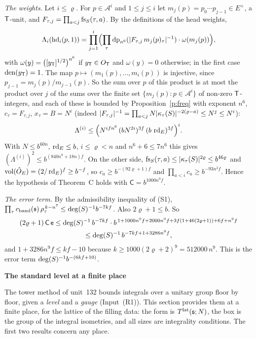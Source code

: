 \documentclass[11pt,a4paper]{article}
\makeatletter
\newcommand{\sect}[2]{\refstepcounter{section}\label{#2}\par\addvspace{19pt plus 4pt minus 2pt}\Needspace{7\baselineskip}%
  \noindent\llap{{\fontsize{13.2}{16}\selectfont\bfseries\color{inkfaint}\thesection}\hspace{9pt}}%
  {\fontsize{13.2}{16}\selectfont\bfseries\color{ink}#1}\par\nopagebreak\vspace{-1pt}}
\theoremstyle{plainx}
\theoremstyle{uprightx}
\renewenvironment{proof}[1][Proof]{\par\pushQED{\qed}\normalfont\topsep0pt\partopsep0pt
  \trivlist\item[\hskip\labelsep\itshape #1.]\ignorespaces}{\popQED\endtrivlist\@endpefalse}
\newcommand{\Inp}[1]{\textup{(#1)}}
\makeatother
\begin{document}
\begin{proof}[Proof of Theorem D]
\emph{The weights.} Let $i\le\varrho$. For $p\in\mathcal{A}^{i}$ and $1\le j\le i$ let $m_j(p)=p_0\cdots p_{j-1}\in E^{\times}$,
a $\mathsf{T}$-unit, and $F_{\tau,j}=\prod_{a<j}\mathrm{fs}_{S}(\tau,a)$. By the definitions of the head weights,
\[\Lambda_i(\mathrm{hd}_i(p,1))=\prod_{j=1}^{i}\Bigl(\prod_\tau\operatorname{dp}_{n^{6}}(|F_{\tau,j}\,m_j(p)_\tau|^{-1})\cdot\omega(m_j(p))\Bigr),\]
with $\omega(y)=\bigl([y_{\mathsf{T}}]^{1/2}\bigr)^{n^{6}}$ if $y_{\mathsf{T}}\in O_{\mathsf{T}}$ and $\omega(y)=0$ otherwise; in the first
case $\operatorname{den}(y_{\mathsf{T}})=1$. The map $p\mapsto(m_1(p),\dots,m_i(p))$ is injective, since $p_{j-1}=m_j(p)/m_{j-1}(p)$. So
the sum over $p$ of this product is at most the product over $j$ of the sums over the finite set
$\{m_j(p):p\in\mathcal{A}^{i}\}$ of non-zero $\mathsf{T}$-integers, and each of these is bounded by
Proposition~\ref{p:freq} with exponent $n^{6}$, $c_\tau=F_{\tau,j}$, $x_\tau=B=N^{i}$ (indeed
$|F_{\tau,j}|^{-1}=\prod_{a<j}N|\kappa_{\tau}(S)|^{-2(\varrho-a)}\le N^{j}\le N^{i}$):
\[\Lambda^{(i)}\le\Bigl(N^{ifn^{6}}\,(bN^{2i})^{3f}\,(b\,\operatorname{rd}_{E})^{3f}\Bigr)^{i}.\]
With $N\le b^{60n}$, $\operatorname{rd}_{E}\le b$, $i\le\varrho<n$ and $n^{6}+6\le7n^{6}$ this gives
$(\Lambda^{(i)})^{2}\le b^{(840n^{9}+18n)f}$. On the other side, $\mathrm{fs}_{S}(\tau,a)\le|\kappa_{\tau}(S)|^{2\varrho}\le b^{46\varrho}$
and $\operatorname{vol}(\hat O_{E})=(2/\operatorname{rd}_{E})^{f}\ge b^{-f}$, so $c_a\ge b^{-(92\varrho+1)f}$ and
$\prod_{a<i}c_a\ge b^{-93n^{2}f}$. Hence the hypothesis of Theorem~C holds with $\mathsf{C}=b^{1000n^{9}f}$.

\emph{The error term.} By the admissibility inequality of \Inp{S1},
$\prod_\tau c_{\mathrm{band}}(\mathfrak{s})\,\rho_\tau^{\,k-n^{7}}\le\deg(S)^{-1}b^{-7kf}$. Also $2\varrho+1\le b$. So
\begin{gather*}(2\varrho+1)\,\mathsf{C}\,\mathsf{e}\le\deg(S)^{-1}\,b^{-7kf}\cdot b^{\,1+1000n^{9}f+2000n^{9}f+3f(1+46(2\varrho+1))+6f+n^{9}f}\\
\le\deg(S)^{-1}\,b^{-7kf+1+3286n^{9}f},\end{gather*}
and $1+3286n^{9}f\le kf-10$ because $k\ge1000(2\varrho+2)^{9}=512000\,n^{9}$. This is the error term
$\deg(S)^{-1}b^{-(6kf+10)}$.
\end{proof}

\sect{The standard level at a finite place}{s:level}
The tower method of unit~132 bounds integrals over a unitary group floor by floor, given a \emph{level} and a
\emph{gauge} (Input~\Inp{R1}). This section provides them at a finite place, for the lattice of the filling data:
the form is $T^{\mathrm{lat}}(\mathfrak{s};N)$, the box is the group of the integral isometries, and all sizes are integrality
conditions. The first two results concern any place.
\end{document}
